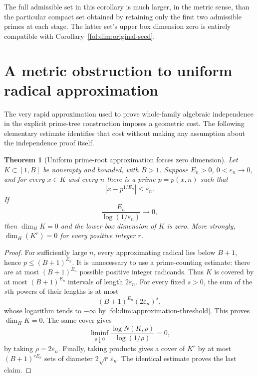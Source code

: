 \documentclass[11pt,a4paper]{article}
\newtheorem{theorem}{Theorem}[section]
\theoremstyle{definition}
\theoremstyle{remark}
\numberwithin{equation}{section}
\begin{document}
The full admissible set in this corollary is much larger, in the metric
sense, than the particular compact set obtained by retaining only the
first two admissible primes at each stage.  The latter set's
upper box dimension zero is entirely compatible with
Corollary~\ref{fol:dim:original-seed}.

\section{A metric obstruction to uniform radical approximation}
\label{fol:sec:metric-obstruction}

The very rapid approximation used to prove whole-family algebraic
independence in the explicit prime-tree construction imposes a geometric cost.
The following elementary estimate identifies that cost without making any
assumption about the independence proof itself.

\begin{theorem}[Uniform prime-root approximation forces zero dimension]
\label{fol:dim:approximation-obstruction}
Let $K\subset[1,B]$ be nonempty and bounded, with $B>1$.  Suppose $E_n>0$,
$0<\varepsilon_n\to0$, and for every $x\in K$ and every $n$ there is a prime
$p=p(x,n)$ such that
\[
 |x-p^{1/E_n}|\le\varepsilon_n.
\]
If
\begin{equation}\label{fol:dim:approximation-threshold}
 \frac{E_n}{\log(1/\varepsilon_n)}\longrightarrow0,
\end{equation}
then $\dim_H K=0$ and the lower box dimension of $K$ is zero.  More
strongly, $\dim_H(K^r)=0$ for every positive integer $r$.
\end{theorem}
\begin{proof}
For sufficiently large $n$, every approximating radical lies below
$B+1$, hence $p\le(B+1)^{E_n}$.  It is unnecessary to use a prime-counting
estimate: there are at most $(B+1)^{E_n}$ possible positive integer
radicands.  Thus $K$ is covered by at most $(B+1)^{E_n}$ intervals of
length $2\varepsilon_n$.  For every fixed $s>0$, the sum of the $s$th
powers of their lengths is at most
\[
 (B+1)^{E_n}(2\varepsilon_n)^s,
\]
whose logarithm tends to $-\infty$ by
\eqref{fol:dim:approximation-threshold}.  This proves $\dim_H K=0$.
The same cover gives
\[
 \liminf_{\rho\downarrow0}
 \frac{\log N(K,\rho)}{\log(1/\rho)}=0,
\]
by taking $\rho=2\varepsilon_n$.  Finally, taking products gives a cover
of $K^r$ by at most $(B+1)^{rE_n}$ sets of diameter
$2\sqrt r\,\varepsilon_n$.  The identical estimate proves the last claim.
\end{proof}
\end{document}
